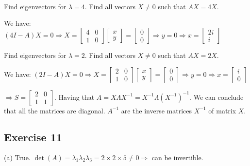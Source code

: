 \documentclass{article}
\begin{document}
Find eigenvectors for $\lambda = 4$. Find all vectors $X \neq 0$ such that $AX = 4X$.

We have:
$(4I - A) X = 0 \Rightarrow X =
    \begin{bmatrix}
        4 & 0 \\
        1 & 0
    \end{bmatrix}
    \begin{bmatrix}
        x \\
        y
    \end{bmatrix} = \begin{bmatrix}
        0 \\
        0
    \end{bmatrix} \Rightarrow y = 0 \Rightarrow x = \begin{bmatrix}
        2i \\
        i
    \end{bmatrix}$


Find eigenvectors for $\lambda = 2$. Find all vectors $X \neq 0$ such that $AX = 2X$.

We have:
$(2I - A) X = 0 \Rightarrow X =
    \begin{bmatrix}
        2 & 0 \\
        1 & 0
    \end{bmatrix}
    \begin{bmatrix}
        x \\
        y
    \end{bmatrix} = \begin{bmatrix}
        0 \\
        0
    \end{bmatrix} \Rightarrow y = 0 \Rightarrow x = \begin{bmatrix}
        i \\
        0
    \end{bmatrix}$

$\Rightarrow S = \begin{bmatrix}
        2 & 0 \\
        1 & 1
    \end{bmatrix}$.
Having that $A = X \Lambda X^{-1} = X^{-1} \Lambda (X^{-1})^{-1}.$
We can conclude that all the matrices are diagonal. $A^{-1}$ are the inverse matrices $X^{-1}$ of matrix $X$.

\subsection{Exercise 11}
(a) True. $\det(A) = \lambda_1 \lambda_2 \lambda_3 = 2 \times 2 \times 5 \neq 0 \Rightarrow$ can be invertible.
\end{document}
